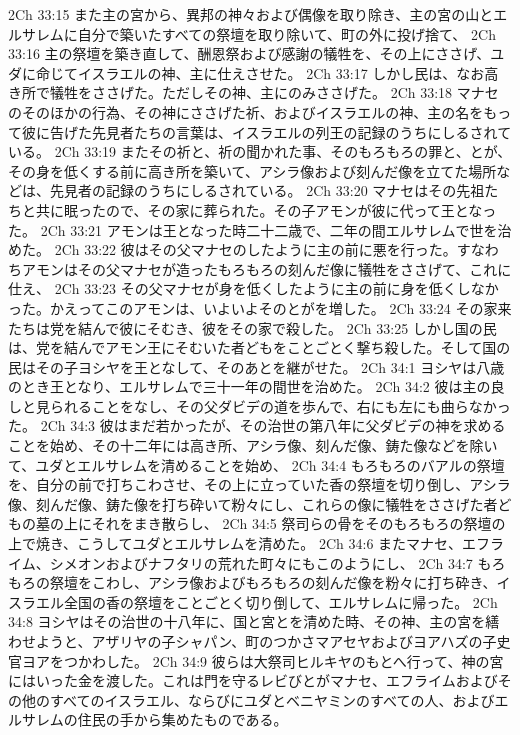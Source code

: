 2Ch 33:15  また主の宮から、異邦の神々および偶像を取り除き、主の宮の山とエルサレムに自分で築いたすべての祭壇を取り除いて、町の外に投げ捨て、
2Ch 33:16  主の祭壇を築き直して、酬恩祭および感謝の犠牲を、その上にささげ、ユダに命じてイスラエルの神、主に仕えさせた。
2Ch 33:17  しかし民は、なお高き所で犠牲をささげた。ただしその神、主にのみささげた。
2Ch 33:18  マナセのそのほかの行為、その神にささげた祈、およびイスラエルの神、主の名をもって彼に告げた先見者たちの言葉は、イスラエルの列王の記録のうちにしるされている。
2Ch 33:19  またその祈と、祈の聞かれた事、そのもろもろの罪と、とが、その身を低くする前に高き所を築いて、アシラ像および刻んだ像を立てた場所などは、先見者の記録のうちにしるされている。
2Ch 33:20  マナセはその先祖たちと共に眠ったので、その家に葬られた。その子アモンが彼に代って王となった。
2Ch 33:21  アモンは王となった時二十二歳で、二年の間エルサレムで世を治めた。
2Ch 33:22  彼はその父マナセのしたように主の前に悪を行った。すなわちアモンはその父マナセが造ったもろもろの刻んだ像に犠牲をささげて、これに仕え、
2Ch 33:23  その父マナセが身を低くしたように主の前に身を低くしなかった。かえってこのアモンは、いよいよそのとがを増した。
2Ch 33:24  その家来たちは党を結んで彼にそむき、彼をその家で殺した。
2Ch 33:25  しかし国の民は、党を結んでアモン王にそむいた者どもをことごとく撃ち殺した。そして国の民はその子ヨシヤを王となして、そのあとを継がせた。
2Ch 34:1  ヨシヤは八歳のとき王となり、エルサレムで三十一年の間世を治めた。
2Ch 34:2  彼は主の良しと見られることをなし、その父ダビデの道を歩んで、右にも左にも曲らなかった。
2Ch 34:3  彼はまだ若かったが、その治世の第八年に父ダビデの神を求めることを始め、その十二年には高き所、アシラ像、刻んだ像、鋳た像などを除いて、ユダとエルサレムを清めることを始め、
2Ch 34:4  もろもろのバアルの祭壇を、自分の前で打ちこわさせ、その上に立っていた香の祭壇を切り倒し、アシラ像、刻んだ像、鋳た像を打ち砕いて粉々にし、これらの像に犠牲をささげた者どもの墓の上にそれをまき散らし、
2Ch 34:5  祭司らの骨をそのもろもろの祭壇の上で焼き、こうしてユダとエルサレムを清めた。
2Ch 34:6  またマナセ、エフライム、シメオンおよびナフタリの荒れた町々にもこのようにし、
2Ch 34:7  もろもろの祭壇をこわし、アシラ像およびもろもろの刻んだ像を粉々に打ち砕き、イスラエル全国の香の祭壇をことごとく切り倒して、エルサレムに帰った。
2Ch 34:8  ヨシヤはその治世の十八年に、国と宮とを清めた時、その神、主の宮を繕わせようと、アザリヤの子シャパン、町のつかさマアセヤおよびヨアハズの子史官ヨアをつかわした。
2Ch 34:9  彼らは大祭司ヒルキヤのもとへ行って、神の宮にはいった金を渡した。これは門を守るレビびとがマナセ、エフライムおよびその他のすべてのイスラエル、ならびにユダとベニヤミンのすべての人、およびエルサレムの住民の手から集めたものである。
